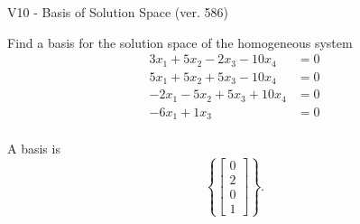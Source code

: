 \begin{exercise}
  \begin{exerciseTitle}V10 - Basis of Solution Space (ver. 586)\end{exerciseTitle}
  \begin{exerciseStatement}
    Find a basis for the solution space of the homogeneous system 
\begin{align*}
 3 x_ 1 + 5 x_ 2 -2 x_ 3 -10 x_ 4 &= 0  \\ 
  5 x_ 1 + 5 x_ 2 + 5 x_ 3 -10 x_ 4 &= 0  \\ 
  -2 x_ 1 -5 x_ 2 + 5 x_ 3 + 10 x_ 4 &= 0  \\ 
  -6 x_ 1 + 1 x_ 3 &= 0  \\ 
 \end{align*}


 
  \end{exerciseStatement}

  \begin{exerciseAnswer}
   A basis is   
\[\left\{\left[\begin{array}{c}
0 \\
2 \\
0 \\
1
\end{array}\right]\right\}.\]

  


  \end{exerciseAnswer}
\end{exercise}